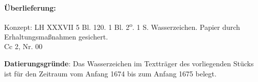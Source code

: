 \begin{ledgroupsized}[r]{120mm}
\footnotesize 
\pstart 
\noindent\textbf{\"{U}berlieferung:}
\pend
\end{ledgroupsized}
\begin{ledgroupsized}[r]{114mm}
\footnotesize 
\pstart \parindent -6mm
%
Konzept: LH XXXVII 5 Bl. 120. 1 Bl. 2\textsuperscript{o}. 1  S. Wasserzeichen. Papier durch Erhaltungsma{\ss}nahmen gesichert.\\Cc 2, Nr. 00 \pend
\end{ledgroupsized}
\vspace*{5mm}

\begin{ledgroup}
\footnotesize 
\pstart
\noindent\footnotesize{\textbf{Datierungsgr\"{u}nde}: 
Das Wasserzeichen im Textträger des vorliegenden Stücks ist für den Zeitraum vom Anfang 1674 bis zum Anfang 1675 belegt.}
\pend
\end{ledgroup}

